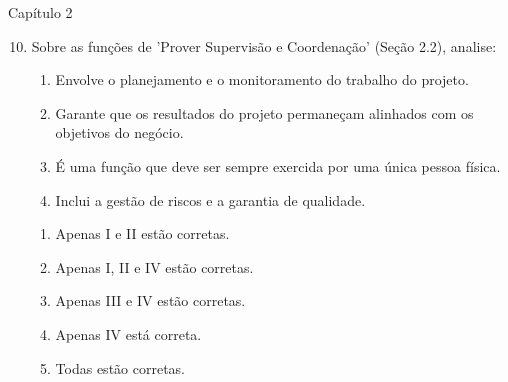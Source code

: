\documentclass{beamer}
\begin{document}
\begin{frame}{Capítulo 2}
	\begin{enumerate}
		\setcounter{enumi}{9}
		\justifying
		\item Sobre as funções de 'Prover Supervisão e Coordenação' (Seção 2.2), analise:
		
		\begin{enumerate}[I]
			\item Envolve o planejamento e o monitoramento do trabalho do projeto.
			\item Garante que os resultados do projeto permaneçam alinhados com os objetivos do negócio.
			\item É uma função que deve ser sempre exercida por uma única pessoa física.
			\item Inclui a gestão de riscos e a garantia de qualidade.
		\end{enumerate}
		
		\vspace{10pt}
		\begin{enumerate}[a]
			\item Apenas I e II estão corretas.
			\item \alert<2>{Apenas I, II e IV estão corretas}.
			\item Apenas III e IV estão corretas.
			\item Apenas IV está correta.
			\item Todas estão corretas.
		\end{enumerate}
	\end{enumerate}
\end{frame}
\end{document}
